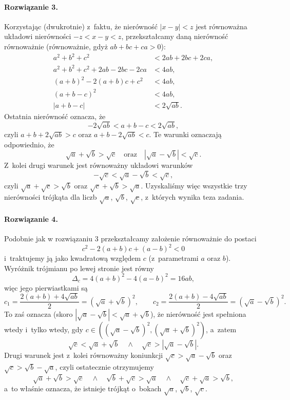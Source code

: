 \paragraph{Rozwiązanie 3.} Korzystając (dwukrotnie) z~faktu, że nierówność $|x-y|<z$ jest równoważna układowi nierówności $-z<x-y<z$, przekształcamy daną nierówność równoważnie (równoważnie, gdyż $ab+bc+ca>0$):
\begin{align*}
    a^2+b^2+c^2&<2ab+2bc+2ca,\\
    a^2+b^2+c^2+2ab-2bc-2ca&<4ab,\\
    (a+b)^2-2(a+b)c+c^2&<4ab,\\
    (a+b-c)^2&<4ab,\\
    |a+b-c|&<2\sqrt{ab}.
\end{align*}
Ostatnia nierówność oznacza, że
\[-2\sqrt{ab}<a+b-c<2\sqrt{ab},\]
czyli $a+b+2\sqrt{ab}>c$ oraz $a+b-2\sqrt{ab}<c$. Te warunki oznaczają odpowiednio, że
\[\sqrt{a}+\sqrt{b}>\sqrt{c}\quad\text{oraz}\quad \left|\sqrt{a}-\sqrt{b}\right|<\sqrt{c}.\]
Z~kolei drugi warunek jest równoważny układowi warunków 
\[-\sqrt{c}<\sqrt{a}-\sqrt{b}<\sqrt{c},\]
czyli $\sqrt{a}+\sqrt{c}>\sqrt{b}$ oraz $\sqrt{c}+\sqrt{b}>\sqrt{a}$. Uzyskaliśmy więc wszystkie trzy nierówności trójkąta dla liczb $\sqrt{a}$, $\sqrt{b}$, $\sqrt{c}$, z~których wynika teza zadania.

\paragraph{Rozwiązanie 4.} Podobnie jak w rozwiązaniu 3 przekształcamy założenie równoważnie do postaci
\[c^2-2(a+b)c+(a-b)^2<0\]
i~traktujemy ją jako kwadratową względem $c$ (z~parametrami $a$ oraz $b$). Wyróżnik trójmianu po lewej stronie jest równy
\[\Delta_c =4(a+b)^2-4(a-b)^2=16ab,\]
więc jego pierwiastkami są
\[c_1=\frac{2(a+b)+4\sqrt{ab}}{2}=\left(\sqrt a+\sqrt b\right)^2,\qquad c_2=\frac{2(a+b)-4\sqrt{ab}}{2}=\left(\sqrt{a}-\sqrt{b}\right)^2.\]
To zaś oznacza (skoro $|\sqrt{a}-\sqrt{b}|<\sqrt{a}+\sqrt{b}$), że nierówność jest spełniona wtedy i~tylko wtedy, gdy $c\in\left((\sqrt{a}-\sqrt{b})^2,(\sqrt{a}+\sqrt{b})^2\right)$, a~zatem
\[\sqrt{c}<\sqrt{a}+\sqrt{b}\quad\land\quad \sqrt{c}>|\sqrt{a}-\sqrt{b}|.\]
Drugi warunek jest z~kolei równoważny koniunkcji $\sqrt{c}>\sqrt{a}-\sqrt{b}$ oraz $\sqrt{c}>\sqrt{b}-\sqrt{a}$, czyli ostatecznie otrzymujemy
\[\sqrt{a}+\sqrt{b}>\sqrt{c}\quad\land\quad \sqrt{b}+\sqrt{c}>\sqrt{a}\quad\land\quad \sqrt{c}+\sqrt{a}>\sqrt{b},\]
a~to właśnie oznacza, że istnieje trójkąt o~bokach $\sqrt{a}$, $\sqrt{b}$, $\sqrt{c}$.

